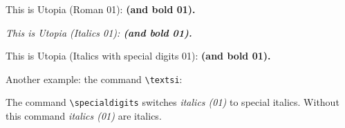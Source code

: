 \documentclass{minimal}
\begin{document}
This is Utopia (Roman 01): \textbf{(and bold 01).}

{\itshape This is Utopia (Italics 01): \textbf{(and bold 01).}}

{\sishape This is Utopia (Italics with special digits 01): \textbf{(and
    bold 01).}}

Another example:  the command \verb|\textsi|:  

{\specialdigits The command \verb|\specialdigits| switches \textit{italics
    (01)} to special italics.}  Without this command \textit{italics
  (01)} are italics.
\end{document}
